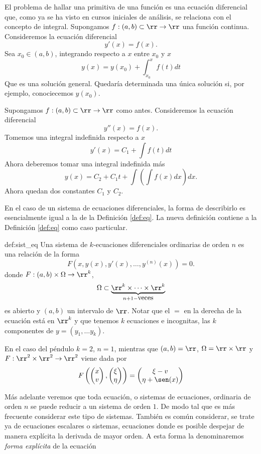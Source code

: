 \begin{ejemplo}{} El problema de hallar una primitiva de una función es una ecuación
diferencial que, como ya se ha visto en cursos iniciales de análisis, se relaciona con el concepto de integral. Supongamos $f:(a,b)\subset \rr\to\rr$ una función continua. Consideremos la ecuación diferencial
\[y'(x)=f(x).\]
Sea $x_0\in(a,b)$, integrando respecto a $x$ entre $x_0$ y $x$
\[y(x)=y(x_0)+\int_{x_0}^xf(t)dt\]
Que es una solución general. Quedaría determinada una única solución si, por ejemplo, conociecemos $y(x_0)$.
\end{ejemplo}



\begin{ejemplo}{} Supongamos $f:(a,b)\subset \rr\to\rr$ como antes. Consideremos la ecuación diferencial
\[y''(x)=f(x).\]
Tomemos una integral indefinida respecto a $x$ 
\[y'(x)=C_1+\int f(t)dt\]
Ahora deberemos tomar una integral indefinida más
\[y(x)=C_2+C_1t +\int\left(\int f(x)dx\right)dx.\]
Ahora quedan dos constantes $C_1$ y $C_2$. 
\end{ejemplo}

En el caso de un sistema de ecuaciones diferenciales, la forma de describirlo es esencialmente 
 igual a la de la Definición \ref{def:eq}. La nueva definición contiene a la Definición \ref{def:eq}
 como caso particular.

 \begin{definicion}{def:sist_eq} 
 Una sistema de $k$-ecuaciones diferenciales ordinarias de orden $n$ 
 es una relación de la forma
\[\boxed{F(x,y(x),y'(x),\ldots,y^{(n)}(x))=0}.\]
donde $F:(a,b)\times \Omega\to\rr^k$, 
\[\Omega\subset\underbrace{\rr^k\times\cdots\times\rr^k}_{n+1-\hbox{veces}}\]
es abierto y $(a,b)$ un intervalo de $\rr$. Notar que el $=$ en la derecha de la ecuación está
en $\rr^k$ y que tenemos $k$ ecuaciones e incognitas, las $k$ componentes de
$y=(y_1,\ldots y_k)$.
  \end{definicion}
  
\begin{ejemplo}{}
 En el caso del péndulo  $k=2$, $n=1$, mientras que $(a,b)=\rr$, $\Omega=\rr\times\rr$ y
 $F:\rr^2\times \rr^2\to\rr^2$ viene dada por
 \[F\left(\begin{pmatrix}
      x \\ v
     \end{pmatrix}
,\begin{pmatrix}
  \xi \\ \eta 
  \end{pmatrix}
  \right)
  =\begin{pmatrix} \xi-v \\ \eta+\sen(x)  \end{pmatrix}
\]
\end{ejemplo}
Más adelante veremos que toda ecuación, o sistemas de ecuaciones, ordinaria de orden $n$ 
se puede reducir a un sistema de orden $1$. De modo tal que es más frecuente considerar
este tipo de sistemas. También es común considerar, se trate ya de ecuaciones 
escalares o sistemas,
 ecuaciones donde es posible despejar 
de manera explícita la derivada de mayor orden. A esta forma la denominaremos 
\emph{forma explícita} de la ecuación

